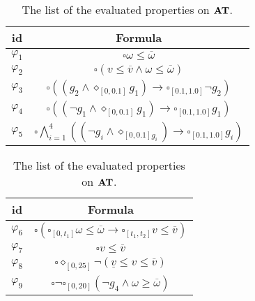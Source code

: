 \begin{table}[tp]
  \centering
  \begin{minipage}[t]{.48\textwidth}
    \centering
    \scriptsize
    \begin{tabular}{c||c}
      id & Formula\\
      \hline
      \hline
      $\varphi_1$ & $\square \omega \leq \overline{\omega}$\\
      $\varphi_2$ & $\square (v \leq \overline{v} \wedge \omega \leq \overline{\omega})$\\
      $\varphi_3$
      & $\square ((g_2 \wedge \diamond_{[0, 0.1]} g_1) \rightarrow \square_{[0.1, 1.0]} \neg g_2)$\\
      $\varphi_4$
      & $\square ((\neg g_1 \wedge \diamond_{[0, 0.1]} g_1) \rightarrow \square_{[0.1, 1.0]} g_1)$\\
      $\varphi_5$
      & $\square \bigwedge_{i=1}^4 ((\neg g_i \wedge \diamond_{[0, 0.1] g_i}) \rightarrow \square_{[0.1, 1.0]} g_i)$\\
    \end{tabular}
  \end{minipage}
  \begin{minipage}[t]{.48\textwidth}
    \centering
    \scriptsize
    \begin{tabular}{c||c}
      id & Formula\\
      \hline
      \hline
      $\varphi_6$
      & $\square (\square_{[0, t_1]} \omega \leq \overline\omega \rightarrow \square_{[t_1, t_2]} v \leq \overline{v})$\\
      $\varphi_7$
      & $\square v \leq \overline{v}$\\
      $\varphi_8$
      & $\square \diamond_{[0,25]} \neg (\underline{v} \leq v \leq  \overline{v})$\\
      $\varphi_9$
      & $\square \neg \square_{[0,20]} (\neg g_4 \wedge \omega \geq \overline{\omega})$\\
    \end{tabular}
  \end{minipage}
  \caption{The list of the evaluated properties on $\mathbf{AT}$.}
  \label{tab:formulas}
  \vspace{-5mm}
\end{table}
